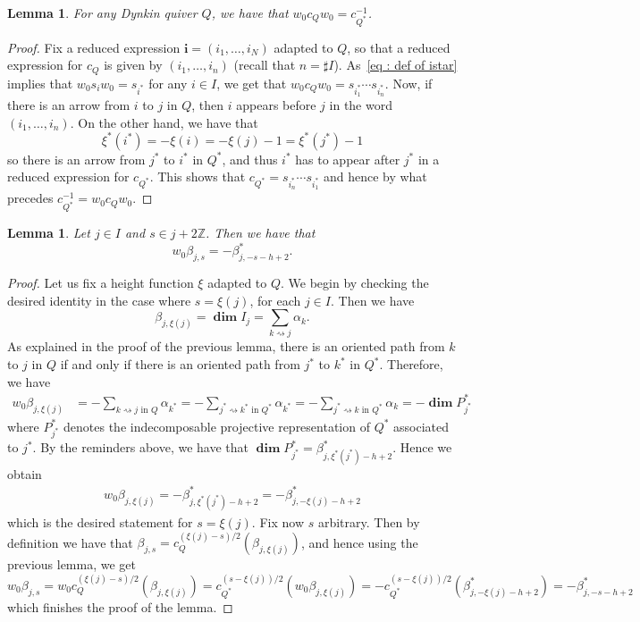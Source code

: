 \documentclass[12pt]{amsart}
\theoremstyle{plain}
\newtheorem{lemma}[theorem]{Lemma}
\theoremstyle{definition}
\numberwithin{equation}{section}
\DeclareMathOperator*{\dimvec}{\mathbf{dim}}
\begin{document}
\begin{lemma}
  For any Dynkin quiver $Q$, we have that $w_0 c_Q w_0 = c_{Q^{*}}^{-1}$. 
\end{lemma}

\begin{proof}
 Fix a reduced expression $\mathbf{i} = (i_1, \ldots , i_N)$ adapted to $Q$, so that a reduced expression for $c_Q$ is given by $(i_1, \ldots , i_n)$ (recall that $n=\sharp I$). 
 As~\eqref{eq : def of istar} implies that $w_0 s_i w_0 = s_{i^{*}}$ for any $i \in I$, we get that  $w_0 c_Q w_0 = s_{i_1^{*}} \cdots s_{i_n^{*}}$. Now, if there is an arrow from $i$ to $j$ in $Q$, then $i$ appears before $j$ in the word $(i_1, \ldots , i_n)$. On the other hand, we have that 
 $$ \xi^{*}(i^{*}) = - \xi(i) = - \xi(j)-1 = \xi^{*}(j^{*})-1 $$
 so there is an arrow from $j^{*}$ to $i^{*}$ in $Q^{*}$, and thus $i^{*}$ has to appear after $j^{*}$ in a reduced expression for $c_{Q^{*}}$. This shows that $ c_{Q^{*}} = s_{i_n^{*}} \cdots s_{i_1^{*}}$ and hence by what precedes $c_{Q^{*}}^{-1} = w_0 c_Q w_0$.
\end{proof}

 \begin{lemma} \label{lem : duality on roots}
 Let $j \in I$ and $s \in j + 2 \mathbb{Z}$. Then we have that 
 $$ w_0 \beta_{j,s} = - \beta_{j, -s-h+2}^{*}. $$
 \end{lemma}

  \begin{proof}
 Let us fix a height function $\xi$ adapted to $Q$. We begin by checking the desired identity in the case  where $s= \xi(j)$, for each $j \in I$. Then we have 
 $$ \beta_{j , \xi(j)} = \dimvec I_j = \sum_{k \rightsquigarrow j} \alpha_k. $$
As explained in the proof of the previous lemma, there is an oriented path from $k$ to $j$ in $Q$ if and only if there is an oriented path from $j^{*}$ to $k^{*}$ in $Q^{*}$. Therefore, we have 
 \begin{align*}
 w_0 \beta_{j,\xi(j)} &= - \sum_{ \text{$k \rightsquigarrow j$ in $Q$}} \alpha_{k^{*}}
 = -  \sum_{ \text{$j^{*} \rightsquigarrow k^{*}$ in $Q^{*}$}} \alpha_{k^{*}} = -  \sum_{ \text{$j^{*} \rightsquigarrow k$ in $Q^{*}$}} \alpha_k = - \dimvec P_{j^{*}}^{*}
 \end{align*}
 where $P_{j^{*}}^{*}$ denotes the indecomposable projective representation of $Q^{*}$ associated to $j^{*}$. By the reminders above, we have that $\dimvec P_{j^{*}}^{*} = \beta_{j, \xi^{*}(j^{*})-h+2}^{*}$. Hence we obtain
 \begin{align*}
 w_0 \beta_{j , \xi(j)} = - \beta_{j, \xi^{*}(j^{*})-h+2}^{*} = - \beta_{j, - \xi(j)-h+2}^{*}
 \end{align*}
 which is the desired statement for $s = \xi(j)$. Fix now $s$ arbitrary. Then by definition we have that $\beta_{j,s} = c_Q^{(\xi(j)-s)/2}(\beta_{j, \xi(j)})$, and hence using the previous lemma, we get
 $$ w_0 \beta_{j,s} = w_0 c_Q^{(\xi(j)-s)/2}(\beta_{j, \xi(j)}) = c_{Q^{*}}^{(s-\xi(j))/2}( w_0 \beta_{j, \xi(j)}) = - c_{Q^{*}}^{(s-\xi(j))/2}(\beta_{j,-\xi(j)-h+2}^{*}) = - \beta_{j, -s-h+2}^{*}
 $$
 which finishes the proof of the lemma. 
 \end{proof}
\end{document}
